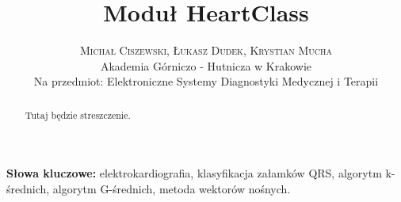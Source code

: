 \documentclass[twoside]{article}
\title{\vspace{-15mm}\fontsize{24pt}{10pt}\selectfont\textbf{Moduł HeartClass}} %
\author{
\large
\textsc{Michał Ciszewski, Łukasz Dudek, Krystian Mucha}\\[2mm] %
\normalsize Akademia Górniczo - Hutnicza w Krakowie \\[1mm] %
\normalsize Na przedmiot: Elektroniczne Systemy Diagnostyki Medycznej i Terapii %
}
\date{}
\begin{document}
\maketitle %

\thispagestyle{fancy} %

\tableofcontents
\vspace{10mm}
\begin{abstract}

Tutaj będzie streszczenie.

\end{abstract}

\smallskip
\noindent \textbf{Słowa kluczowe:} elektrokardiografia, klasyfikacja załamków QRS, algorytm k-średnich, algorytm G-średnich, metoda wektorów nośnych.














\end{document}
